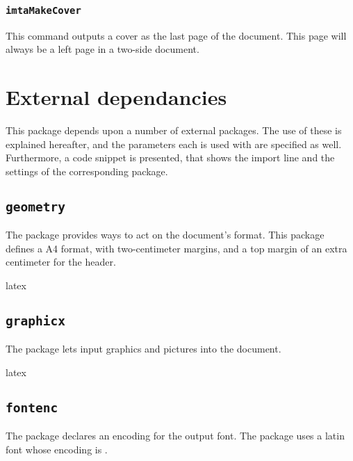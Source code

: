 \documentclass{article}
\begin{document}
\subsubsection{\texttt{imtaMakeCover}}

This command outputs a cover as the last page of the document.
This page will always be a left page in a two-side document.

\section{External dependancies}

This package depends upon a number of external packages.
The use of these is explained hereafter, and the parameters each is used with are specified as well.
Furthermore, a code snippet is presented, that shows the import line and the settings of the corresponding package.

\subsection{\texttt{geometry}}

The  package provides ways to act on the document's format.
This package defines a A4 format, with two-centimeter margins, and a top margin of an extra centimeter for the header.

\begin{imtaCode}{latex}
\RequirePackage[a4paper, margin=2cm, top=3cm]{geometry}
\end{imtaCode}

\subsection{\texttt{graphicx}}

The  package lets input graphics and pictures into the document.

\begin{imtaCode}{latex}
\RequirePackage{graphicx}
\end{imtaCode}

\subsection{\texttt{fontenc}}

The  package declares an encoding for the output font.
The  package uses a latin font whose encoding is .
\end{document}
